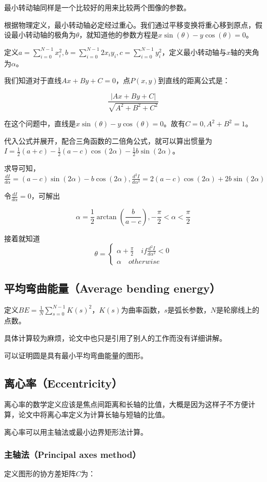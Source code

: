 \documentclass{ctexart}
\begin{document}
最小转动轴同样是一个比较好的用来比较两个图像的参数。

根据物理定义，最小转动轴必定经过重心。我们通过平移变换将重心移到原点，假设最小转动轴的极角为$\theta$，就知道他的参数方程是$x\sin(\theta)-y\cos(\theta)=0$。

定义$a=\sum\limits_{i=0}^{N-1}x_i^2,b=\sum\limits_{i=0}^{N-1}2x_iy_i,c=\sum\limits_{i=0}^{N-1}y_i^2$，定义最小转动轴与$x$轴的夹角为$\alpha$。

我们知道对于直线$Ax+By+C=0$，点$P(x,y)$到直线的距离公式是：

\[\frac{|Ax+By+C|}{\sqrt{A^2+B^2+C^2}}\]

在这个问题中，直线是$x\sin(\theta)-y\cos(\theta)=0$。故有$C=0,A^2+B^2=1$。

代入公式并展开，配合三角函数的二倍角公式，就可以算出惯量为$I=\frac{1}{2}(a+c)-\frac{1}{2}(a-c)\cos(2\alpha)-\frac{1}{2}b\sin(2\alpha)$。

求导可知，$\frac{dI}{d\alpha}=(a-c)\sin(2\alpha)-b\cos(2\alpha),\frac{d^2I}{d\alpha^2}=2(a-c)\cos(2\alpha)+2b\sin(2\alpha)$

令$\frac{dI}{d\alpha}=0$，可解出

\[\alpha=\frac{1}{2}\arctan(\frac{b}{a-c}),-\frac{\pi}{2}<\alpha<\frac{\pi}{2}\]

接着就知道
\[\theta=\begin{cases}\alpha+\frac{\pi}{2} \quad if \frac{d^2I}{d\alpha^2}<0 \\ \alpha \quad otherwise\end{cases}\]
\subsection{平均弯曲能量（Average bending energy）}
定义$BE=\frac{1}{N}\sum\limits_{s=0}^{N-1}K(s)^2$，$K(s)$为曲率函数，$s$是弧长参数，$N$是轮廓线上的点数。

具体计算较为麻烦，论文中也只是引用了别人的工作而没有详细讲解。

可以证明圆是具有最小平均弯曲能量的图形。
\subsection{离心率（Eccentricity）}
离心率的数学定义应该是焦点间距离和长轴的比值，大概是因为这样子不方便计算，论文中将离心率定义为计算长轴与短轴的比值。

离心率可以用主轴法或最小边界矩形法计算。
\subsubsection{主轴法（Principal axes method）}
定义图形的协方差矩阵$C$为：
\end{document}
